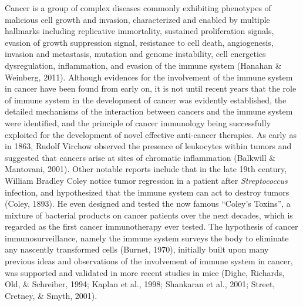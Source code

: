 \documentclass[12pt,twoside,openany,\mydriver]{thesis}  %
\begin{document}
Cancer is a group of complex diseases commonly exhibiting phenotypes of malicious cell growth and invasion, characterized and enabled by multiple hallmarks including replicative immortality, sustained proliferation signals, evasion of growth suppression signal, resistance to cell death, angiogenesis, invasion and metastasis, mutation and genome instability, cell energetics dysregulation, inflammation, and evasion of the immune system (Hanahan \& Weinberg, 2011). Although evidences for the involvement of the immune system in cancer have been found from early on, it is not until recent years that the role of immune system in the development of cancer was evidently established, the detailed mechanisms of the interaction between cancers and the immune system were identified, and the principle of cancer immunology being successfully exploited for the development of novel effective anti-cancer therapies. As early as in 1863, Rudolf Virchow observed the presence of leukocytes within tumors and suggested that cancers arise at sites of chromatic inflammation (Balkwill \& Mantovani, 2001). Other notable reports include that in the late 19th century, William Bradley Coley notice tumor regression in a patient after \emph{Streptococcus} infection, and hypothesized that the immune system can act to destroy tumors (Coley, 1893). He even designed and tested the now famous ``Coley's Toxins'', a mixture of bacterial products on cancer patients over the next decades, which is regarded as the first cancer immunotherapy ever tested. The hypothesis of cancer immunosurveillance, namely the immune system surveys the body to eliminate any nascently transformed cells (Burnet, 1970), initially built upon many previous ideas and observations of the involvement of immune system in cancer, was supported and validated in more recent studies in mice (Dighe, Richards, Old, \& Schreiber, 1994; Kaplan et al., 1998; Shankaran et al., 2001; Street, Cretney, \& Smyth, 2001).
\end{document}
